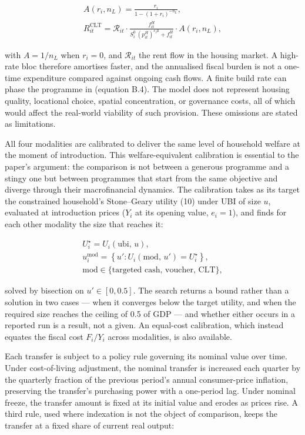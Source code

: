 \documentclass[preprint,review,12pt]{elsarticle}
\begin{document}
\[\begin{gathered} A(r_i, n_L) = \frac{r_i}{1 - (1 + r_i)^{-n_L}}, \\ R^{\mathrm{CLT}}_{it} = \mathcal{R}_{it} \cdot \frac{f^H_{it}}{S^0_i \, (p^H_{it})^{\varepsilon_i \mu} + f^H_{it}} \cdot A(r_i, n_L), \end{gathered} \tag{20}\]

with \(A = 1/n_L\) when \(r_i = 0\), and \(\mathcal{R}_{it}\) the rent
flow in the housing market. A high-rate bloc therefore amortises faster,
and the annualised fiscal burden is not a one-time expenditure compared
against ongoing cash flows. A finite build rate can phase the programme
in (equation B.4). The model does not represent housing quality,
locational choice, spatial concentration, or governance costs, all of
which would affect the real-world viability of such provision. These
omissions are stated as limitations.

All four modalities are calibrated to deliver the same level of
household welfare at the moment of introduction. This welfare-equivalent
calibration is essential to the paper's argument: the comparison is not
between a generous programme and a stingy one but between programmes
that start from the same objective and diverge through their
macrofinancial dynamics. The calibration takes as its target the
constrained household's Stone--Geary utility (10) under UBI of size
\(u\), evaluated at introduction prices (\(Y_i\) at its opening value,
\(e_i = 1\)), and finds for each other modality the size that reaches
it:

\[\begin{gathered} U^\star_i = U_i(\mathrm{ubi},\, u), \\ u^{\mathrm{mod}}_i = \left\{ u' : U_i(\mathrm{mod},\, u') = U^\star_i \right\}, \\ \mathrm{mod} \in \{\text{targeted cash, voucher, CLT}\}, \end{gathered} \tag{21}\]

solved by bisection on \(u' \in [0, 0.5]\). The search returns a bound
rather than a solution in two cases --- when it converges below the
target utility, and when the required size reaches the ceiling of 0.5 of
GDP --- and whether either occurs in a reported run is a result, not a
given. An equal-cost calibration, which instead equates the fiscal cost
\(F_i/Y_i\) across modalities, is also available.

Each transfer is subject to a policy rule governing its nominal value
over time. Under cost-of-living adjustment, the nominal transfer is
increased each quarter by the quarterly fraction of the previous
period's annual consumer-price inflation, preserving the transfer's
purchasing power with a one-period lag. Under nominal freeze, the
transfer amount is fixed at its initial value and erodes as prices rise.
A third rule, used where indexation is not the object of comparison,
keeps the transfer at a fixed share of current real output:
\end{document}
